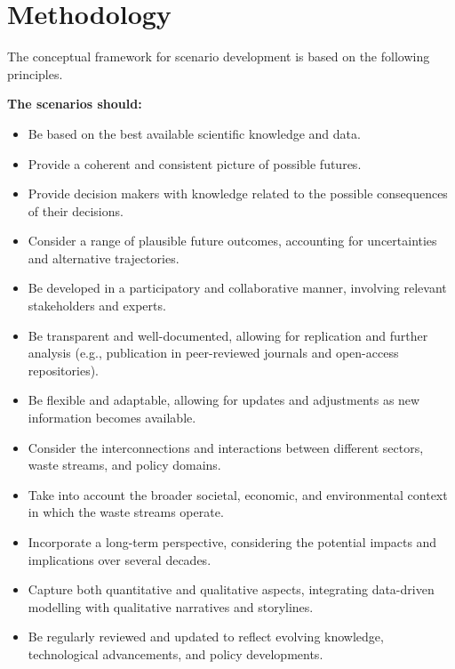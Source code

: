 \chapter{Methodology}\label{chapter:methodology}
\localtableofcontents %
\clearpage


The conceptual framework for scenario development is based on the following principles.


\textbf{The scenarios should:}
\begin{itemize}
  \item Be based on the best available scientific knowledge and data.
  \item Provide a coherent and consistent picture of possible futures.
  \item Provide decision makers with knowledge related to the possible consequences of their decisions.
  \item Consider a range of plausible future outcomes, accounting for uncertainties and alternative trajectories.
  \item Be developed in a participatory and collaborative manner, involving relevant stakeholders and experts.
  \item Be transparent and well-documented, allowing for replication and further analysis (e.g., publication in peer-reviewed journals and open-access repositories).
  \item Be flexible and adaptable, allowing for updates and adjustments as new information becomes available.
  \item Consider the interconnections and interactions between different sectors, waste streams, and policy domains.
  \item Take into account the broader societal, economic, and environmental context in which the waste streams operate.
  \item Incorporate a long-term perspective, considering the potential impacts and implications over several decades.
  \item Capture both quantitative and qualitative aspects, integrating data-driven modelling with qualitative narratives and storylines.
  \item Be regularly reviewed and updated to reflect evolving knowledge, technological advancements, and policy developments.

\end{itemize}

